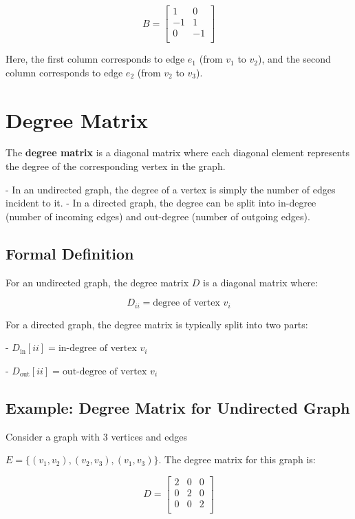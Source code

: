 \documentclass{book}
\begin{document}
\[
B = \begin{bmatrix}
1 & 0 \\
-1 & 1 \\
0 & -1 \\
\end{bmatrix}
\]

Here, the first column corresponds to edge \(e_1\) (from \(v_1\) to \(v_2\)), and the second column corresponds to edge \(e_2\) (from \(v_2\) to \(v_3\)).

\section{Degree Matrix}

The \textbf{degree matrix} is a diagonal matrix where each diagonal element represents the degree of the corresponding vertex in the graph.

- In an undirected graph, the degree of a vertex is simply the number of edges incident to it.
- In a directed graph, the degree can be split into in-degree (number of incoming edges) and out-degree (number of outgoing edges).

\subsection{Formal Definition}

For an undirected graph, the degree matrix \(D\) is a diagonal matrix where:

\[
D_{ii} = \text{degree of vertex } v_i
\]

For a directed graph, the degree matrix is typically split into two parts:

- \(D_{\text{in}}[ii] = \text{in-degree of vertex } v_i\)

- \(D_{\text{out}}[ii] = \text{out-degree of vertex } v_i\)

\subsection{Example: Degree Matrix for Undirected Graph}

Consider a graph with 3 vertices and edges

\(E = \{(v_1, v_2), (v_2, v_3), (v_1, v_3)\}\). The degree matrix for this graph is:

\[
D = \begin{bmatrix}
2 & 0 & 0 \\
0 & 2 & 0 \\
0 & 0 & 2 \\
\end{bmatrix}
\]
\end{document}
